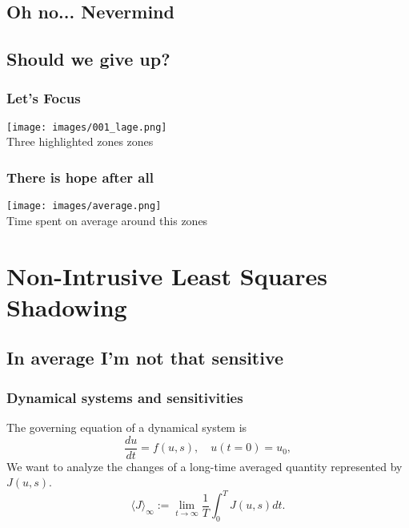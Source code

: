 \documentclass{beamer}
\begin{document}
  \subsection{Oh no... Nevermind}


  \subsection{Should we give up?}
  \begin{frame}
    \frametitle{Let's Focus}
    \begin{center}
    \texttt{[image: images/001\_lage.png]}\\
    \tiny{Three highlighted zones zones}
  \end{center}
  \end{frame}

\begin{frame}
  \frametitle{There is hope after all}
  \begin{center}
  \texttt{[image: images/average.png]}\\
  \tiny{Time spent on average around this zones}
\end{center}
\end{frame}


\section{Non-Intrusive Least Squares Shadowing}
\subsection{In average I'm not that sensitive}
\begin{frame}
  \frametitle{Dynamical systems and sensitivities}
  The governing equation of a dynamical system is
  \begin{equation}
    \frac{du}{dt} = f(u,s), \quad{u(t=0)=u_0},
  \end{equation}
  We want to analyze the changes of a long-time averaged quantity represented by $J(u,s)$.
  \begin{equation}
    \langle J \rangle_\infty := \lim_{t\rightarrow \infty} \frac{1}{T}\int_0^T J(u,s)dt.
  \end{equation}
\end{frame}
\end{document}
